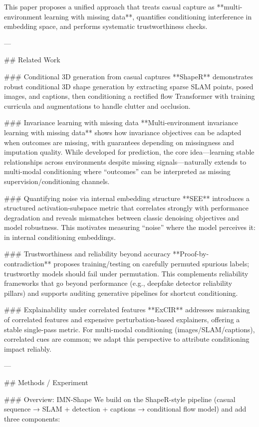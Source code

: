 This paper proposes a unified approach that treats casual capture as **multi-environment learning with missing data**, quantifies conditioning interference in embedding space, and performs systematic trustworthiness checks.

---

## Related Work  

### Conditional 3D generation from casual captures  
**ShapeR** demonstrates robust conditional 3D shape generation by extracting sparse SLAM points, posed images, and captions, then conditioning a rectified flow Transformer with training curricula and augmentations to handle clutter and occlusion.

### Invariance learning with missing data  
**Multi-environment invariance learning with missing data** shows how invariance objectives can be adapted when outcomes are missing, with guarantees depending on missingness and imputation quality. While developed for prediction, the core idea—learning stable relationships across environments despite missing signals—naturally extends to multi-modal conditioning where “outcomes” can be interpreted as missing supervision/conditioning channels.

### Quantifying noise via internal embedding structure  
**SEE** introduces a structured activation-subspace metric that correlates strongly with performance degradation and reveals mismatches between classic denoising objectives and model robustness. This motivates measuring “noise” where the model perceives it: in internal conditioning embeddings.

### Trustworthiness and reliability beyond accuracy  
**Proof-by-contradiction** proposes training/testing on carefully permuted spurious labels; trustworthy models should fail under permutation. This complements reliability frameworks that go beyond performance (e.g., deepfake detector reliability pillars) and supports auditing generative pipelines for shortcut conditioning.

### Explainability under correlated features  
**ExCIR** addresses misranking of correlated features and expensive perturbation-based explainers, offering a stable single-pass metric. For multi-modal conditioning (images/SLAM/captions), correlated cues are common; we adapt this perspective to attribute conditioning impact reliably.

---

## Methods / Experiment  

### Overview: IMN-Shape  
We build on the ShapeR-style pipeline (casual sequence → SLAM + detection + captions → conditional flow model) and add three components:

